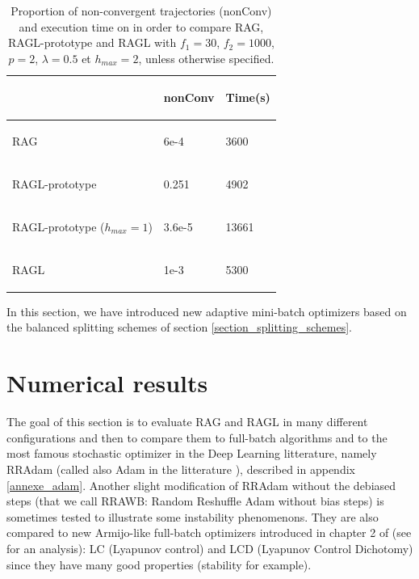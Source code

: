 \begin{table}[h!]
	\centering
	\caption{Proportion of non-convergent trajectories (nonConv) and execution time on \polyFive in order to compare RAG, RAGL-prototype and RAGL with $f_1=30$, $f_2=1000$, $p=2$, $\lambda=0.5$ et $h_{max}=2$, unless otherwise specified.}
	\begin{tabular}{lll}
		\toprule
		\begin{bf} \diagbox{Algos}{} \end{bf} & \begin{bf}nonConv\end{bf} & \begin{bf}Time(s)\end{bf} \\
		\midrule
		\begin{bf}RAG\end{bf} & 6e-4 & 3600 \\ \midrule
		\begin{bf}RAGL-prototype\end{bf} & 0.251 & 4902 \\ \midrule
		\begin{bf}RAGL-prototype ($h_{max}=1$)\end{bf} & 3.6e-5 & 13661 \\ \midrule
		\begin{bf}RAGL\end{bf} & 1e-3 & 5300 \\ \bottomrule
	\end{tabular}
	\label{polyFive_ecreme}
\end{table} 

In this section, we have introduced new adaptive mini-batch optimizers based on the balanced splitting schemes of section \ref{section_splitting_schemes}.

\section{Numerical results}
\label{section_results}

The goal of this section is to evaluate RAG and RAGL in many different configurations and then to compare them to full-batch algorithms and to the most famous stochastic optimizer
in the Deep Learning litterature, namely RRAdam (called also Adam in the litterature \cite{Adam}), described in appendix \ref{annexe_adam}. Another slight modification of RRAdam without the debiased steps (that we call RRAWB: Random Reshuffle Adam without bias steps) is sometimes tested to illustrate some instability phenomenons. They are also compared to new Armijo-like full-batch optimizers introduced in chapter 2 of \cite{Bilel_thesis} (see \cite{Lyap_Theory_Bilel} for an analysis): LC (Lyapunov control) and LCD (Lyapunov Control Dichotomy) since they have many good properties (stability for example).

